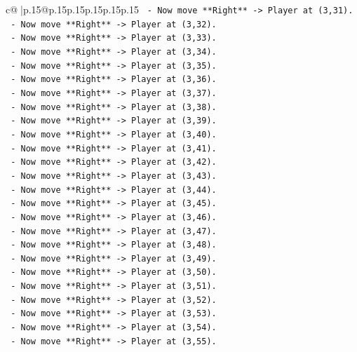\documentclass{article}
\begin{document}
{\begin{supertabular}{c@{$\;$}|p{.15\linewidth}@{}p{.15\linewidth}p{.15\linewidth}p{.15\linewidth}p{.15\linewidth}p{.15\linewidth}}
{{{\texttt{    {-}   Now move **Right** {-}> Player at (3,31).} \\
\texttt{    {-}   Now move **Right** {-}> Player at (3,32).} \\
\texttt{    {-}   Now move **Right** {-}> Player at (3,33).} \\
\texttt{    {-}   Now move **Right** {-}> Player at (3,34).} \\
\texttt{    {-}   Now move **Right** {-}> Player at (3,35).} \\
\texttt{    {-}   Now move **Right** {-}> Player at (3,36).} \\
\texttt{    {-}   Now move **Right** {-}> Player at (3,37).} \\
\texttt{    {-}   Now move **Right** {-}> Player at (3,38).} \\
\texttt{    {-}   Now move **Right** {-}> Player at (3,39).} \\
\texttt{    {-}   Now move **Right** {-}> Player at (3,40).} \\
\texttt{    {-}   Now move **Right** {-}> Player at (3,41).} \\
\texttt{    {-}   Now move **Right** {-}> Player at (3,42).} \\
\texttt{    {-}   Now move **Right** {-}> Player at (3,43).} \\
\texttt{    {-}   Now move **Right** {-}> Player at (3,44).} \\
\texttt{    {-}   Now move **Right** {-}> Player at (3,45).} \\
\texttt{    {-}   Now move **Right** {-}> Player at (3,46).} \\
\texttt{    {-}   Now move **Right** {-}> Player at (3,47).} \\
\texttt{    {-}   Now move **Right** {-}> Player at (3,48).} \\
\texttt{    {-}   Now move **Right** {-}> Player at (3,49).} \\
\texttt{    {-}   Now move **Right** {-}> Player at (3,50).} \\
\texttt{    {-}   Now move **Right** {-}> Player at (3,51).} \\
\texttt{    {-}   Now move **Right** {-}> Player at (3,52).} \\
\texttt{    {-}   Now move **Right** {-}> Player at (3,53).} \\
\texttt{    {-}   Now move **Right** {-}> Player at (3,54).} \\
\texttt{    {-}   Now move **Right** {-}> Player at (3,55).} \\
}}}
\end{supertabular}}
\end{document}
